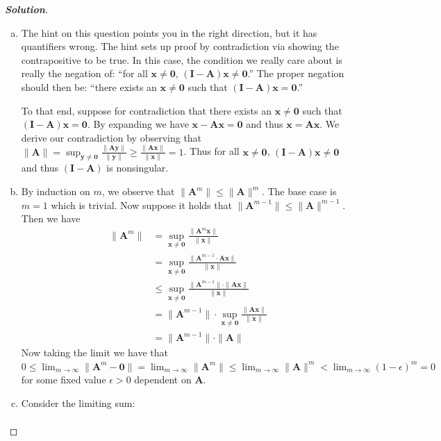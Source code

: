 \documentclass[11pt]{article}
\renewcommand{\vec}[1]{\mathbf{#1}}
\newenvironment{solution}{%
  \begin{proof}[\textbf{Solution}]$ $\par\nobreak\ignorespaces
}{%
  \end{proof}
}
\theoremstyle{definition}
\begin{document}
\begin{solution}
\begin{enumerate}[(a)]
    \item The hint on this question points you in the right direction, but it has quantifiers wrong. The hint sets up proof by contradiction via showing the contrapositive to be true. In this case, the condition we really care about is really the negation of: ``for all $\vec{x} \neq \vec{0}$, $(\vec{I} - \vec{A})\vec{x} \neq \vec{0}$.'' The proper negation should then be: ``there exists an $\vec{x} \neq \vec{0}$ such that $(\vec{I} - \vec{A})\vec{x} = \vec{0}$.''

    To that end, suppose for contradiction that there exists an $\vec{x} \neq \vec{0}$ such that $(\vec{I} - \vec{A})\vec{x} = \vec{0}$. By expanding we have $\vec{x} - \vec{A}\vec{x} = \vec{0}$ and thus $\vec{x} = \vec{A}\vec{x}$. We derive our contradiction by observing that $\|\vec{A}\| = \sup_{\vec{y} \neq \vec{0}}\frac{\|\vec{A}\vec{y}\|}{\|\vec{y}\|} \geq \frac{\|\vec{A}\vec{x}\|}{\|\vec{x}\|} = 1$. Thus for all $\vec{x} \neq \vec{0}$, $(\vec{I} - \vec{A})\vec{x} \neq \vec{0}$ and thus $(\vec{I} - \vec{A})$ is nonsingular.
    \item By induction on $m$, we observe that $\|\vec{A}^m\| \leq \|\vec{A}\|^m$. The base case is $m = 1$ which is trivial. Now suppose it holds that $\|\vec{A}^{m-1}\| \leq \|\vec{A}\|^{m-1}$. Then we have
    \begin{align*}
        \|\vec{A}^m\| &= \sup_{\vec{x} \neq \vec{0}} \frac{\|\vec{A}^m\vec{x}\|}{\|\vec{x}\|} \\
        &= \sup_{\vec{x} \neq \vec{0}} \frac{\|\vec{A}^{m-1} \cdot \vec{A}\vec{x}\|}{\|\vec{x}\|} \\
        &\leq \sup_{\vec{x} \neq \vec{0}} \frac{\|\vec{A}^{m-1}\| \cdot \|\vec{A}\vec{x}\|}{\|\vec{x}\|} \\
        &= \|\vec{A}^{m-1}\| \cdot \sup_{\vec{x} \neq \vec{0}} \frac{\|\vec{A}\vec{x}\|}{\|\vec{x}\|} \\
        &= \|\vec{A}^{m-1}\| \cdot \|\vec{A}\|
    \end{align*}
    Now taking the limit we have that $0 \leq \lim_{m \rightarrow \infty} \|\vec{A}^m - \vec{0}\| = \lim_{m \rightarrow \infty} \|\vec{A}^m\| \leq \lim_{m \rightarrow \infty} \|\vec{A}\|^m < \lim_{m \rightarrow \infty} (1 - \epsilon)^m = 0$ for some fixed value $\epsilon > 0$ dependent on $\vec{A}$.
    \item Consider the limiting sum:
    \begin{align*}

\end{align*}
\end{enumerate}
\end{solution}
\end{document}
